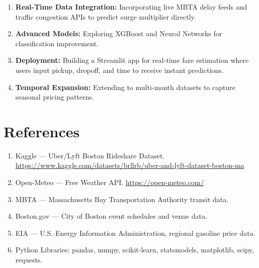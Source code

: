 \documentclass[12pt,a4paper]{article}
\begin{document}
\begin{enumerate}
    \item \textbf{Real-Time Data Integration:} Incorporating live MBTA delay feeds and traffic congestion APIs to predict surge multiplier directly.
    \item \textbf{Advanced Models:} Exploring XGBoost and Neural Networks for classification improvement.
    \item \textbf{Deployment:} Building a Streamlit app for real-time fare estimation where users input pickup, dropoff, and time to receive instant predictions.
    \item \textbf{Temporal Expansion:} Extending to multi-month datasets to capture seasonal pricing patterns.
\end{enumerate}

\newpage

\section{References}

\begin{enumerate}
    \item Kaggle --- Uber/Lyft Boston Rideshare Dataset. \url{https://www.kaggle.com/datasets/brllrb/uber-and-lyft-dataset-boston-ma}
    \item Open-Meteo --- Free Weather API. \url{https://open-meteo.com/}
    \item MBTA --- Massachusetts Bay Transportation Authority transit data.
    \item Boston.gov --- City of Boston event schedules and venue data.
    \item EIA --- U.S. Energy Information Administration, regional gasoline price data.
    \item Python Libraries: pandas, numpy, scikit-learn, statsmodels, matplotlib, scipy, requests.
\end{enumerate}
\end{document}
